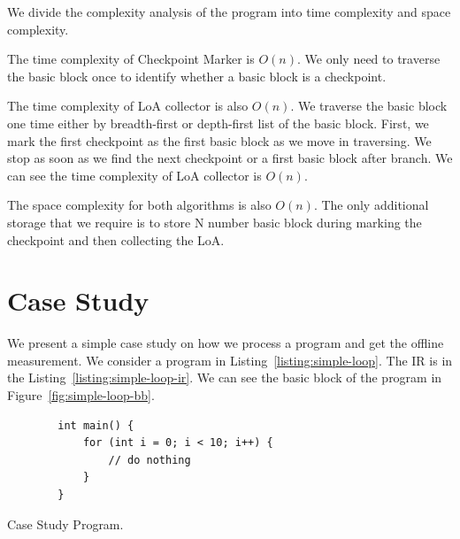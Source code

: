 We divide the complexity analysis of the program into time complexity and space
complexity. 

The time complexity of Checkpoint Marker is $O(n)$. We only need to traverse the
basic block once to identify whether a basic block is a checkpoint.

The time complexity of LoA collector is also $O(n)$. We traverse the basic block
one time either by breadth-first or depth-first list of the basic block. First,
we mark the first checkpoint as the first basic block as we move in traversing.
We stop as soon as we find the next checkpoint or a first basic block after
branch. We can see the time complexity of LoA collector is $O(n)$.

The space complexity for both algorithms is also $O(n)$. The only additional
storage that we require is to store N number basic block during marking the
checkpoint and then collecting the LoA.

\section{Case Study}

We present a simple case study on how we process a program and
get the offline measurement. We consider a program in
Listing~\ref{listing:simple-loop}. The IR is in the
Listing~\ref{listing:simple-loop-ir}. We can see the basic block of the program
in Figure~\ref{fig:simple-loop-bb}. 


\begin{listing}[h]
    \begin{verbatim}
        int main() {
            for (int i = 0; i < 10; i++) {
                // do nothing
            }
        }
    \end{verbatim}
    \caption{Case Study Program.}    
    \label{listing:simple-loop}
\end{listing}


